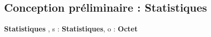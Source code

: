 \subsection{Conception préliminaire : Statistiques}

\begin{algorithme}
    {}{\textbf{Statistiques}}
    {}
    {, }
    {}
    {s : \textbf{Statistiques}, o : \textbf{Octet}}
    {\naturel}
    {}
\end{algorithme}